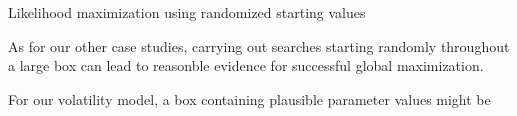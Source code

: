 \begin{frame}[fragile]{Likelihood maximization using randomized starting values}

\bi

\item As for our other case studies, carrying out searches starting randomly throughout a large box can lead to reasonble evidence for successful global maximization.

\item For our volatility model, a box containing plausible parameter values might be

\ei

\begin{knitrout}\small
{}\color{fgcolor}\begin{kframe}
\begin{alltt}
 \hlkwb{<-} \hldef{(}
 \hldef{=}\hldef{(}\hldef{,}\hldef{),}
     \hldef{=}\hldef{(}\hlopt{-}\hldef{,}\hldef{),}
  \hldef{=} \hldef{(}\hldef{,}\hldef{),}
  \hldef{=} \hldef{(}\hldef{,}\hldef{),}
  \hldef{=} \hldef{(}\hlopt{-}\hldef{,}\hldef{),}
  \hldef{=} \hldef{(}\hlopt{-}\hldef{,}\hldef{)}
\hldef{)}
\end{alltt}
\end{kframe}
\end{knitrout}

\end{frame}

